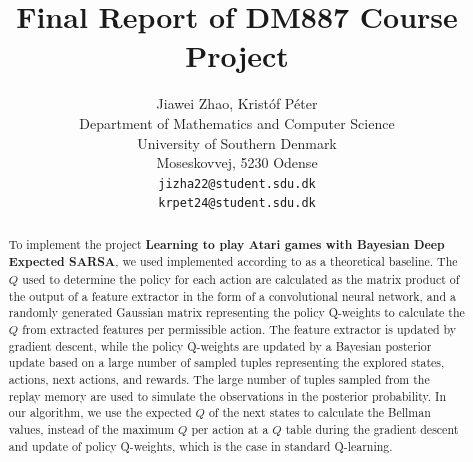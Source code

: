 \documentclass{article}
\title{Final Report of DM887 Course Project}
\author{%
  Jiawei Zhao, Kristóf Péter\\
  Department of Mathematics and Computer Science\\
  University of Southern Denmark\\
  Moseskovvej, 5230 Odense \\
  \texttt{jizha22@student.sdu.dk} \\
  \texttt{krpet24@student.sdu.dk} \\
}
\begin{document}
\maketitle
\clearpage

\begin{abstract}
To implement the project \textbf{Learning to play Atari games with Bayesian Deep Expected SARSA}, we used \cite{BDQN} implemented according to \cite{EEtBDQN} as a theoretical baseline. The $Q$ used to determine the policy for each action are calculated as the matrix product of the output of a feature extractor in the form of a convolutional neural network, and a randomly generated Gaussian matrix representing the policy Q-weights to calculate the $Q$ from extracted features per permissible action. The feature extractor is updated by gradient descent, while the policy Q-weights are updated by a Bayesian posterior update based on a large number of sampled tuples representing the explored states, actions, next actions, and rewards. The large number of tuples sampled from the replay memory are used to simulate the observations in the posterior probability. In our algorithm, we use the expected $Q$ of the next states to calculate the Bellman values, instead of the maximum $Q$ per action at a $Q$ table during the gradient descent and update of policy Q-weights, which is the case in standard Q-learning.
\end{abstract}
\end{document}
